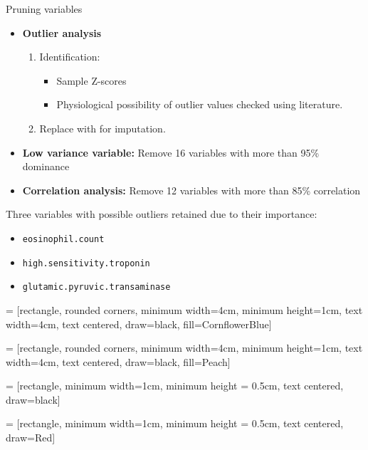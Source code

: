 \documentclass[aspectratio=169,xcolor=dvipsnames]{beamer}
\begin{document}

\begin{frame}{Pruning variables}
\begin{itemize}
    \item \textbf{Outlier analysis}
    \begin{enumerate}
        \item Identification:
            \begin{itemize}
                \item Sample Z-scores
                \item Physiological possibility of outlier values checked using literature.
            \end{itemize}
        \item Replace with  for imputation.
    \end{enumerate}

    \item \textbf{Low variance variable:}
    Remove \alert{16} variables with more than \alert{95\% dominance}

    \item \textbf{Correlation analysis:}
    Remove \alert{12} variables with more than \alert{85\% correlation}
\end{itemize}

Three variables with possible outliers retained due to their importance:
\begin{itemize}
    \item \texttt{eosinophil.count}
    \item \texttt{high.sensitivity.troponin}
    \item \texttt{glutamic.pyruvic.transaminase}
\end{itemize}

\end{frame}
 = [rectangle, rounded corners, 
minimum width=4cm, 
minimum height=1cm,
text width=4cm,
text centered, 
draw=black, 
fill=CornflowerBlue]

 = [rectangle, rounded corners, 
minimum width=4cm, 
minimum height=1cm,
text width=4cm,
text centered, 
draw=black, 
fill=Peach]

 = [rectangle, 
minimum width=1cm, 
minimum height = 0.5cm,
text centered, 
draw=black]

 = [rectangle, 
minimum width=1cm, 
minimum height = 0.5cm,
text centered, 
draw=Red]
\end{document}
